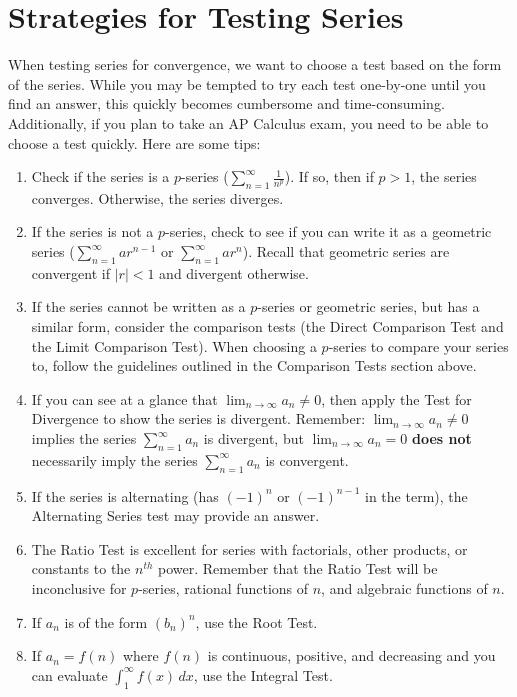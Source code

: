 \section{Strategies for Testing Series}
When testing series for convergence, we want to choose a test based on the 
form of the series. While you may be tempted to try each test one-by-one until 
you find an answer, this quickly becomes cumbersome and time-consuming. 
Additionally, if you plan to take an AP Calculus exam, you need to be able to 
choose a test quickly. Here are some tips:
\begin{enumerate}
\item Check if the series is a $p$-series ($\sum_{n=1}^\infty \frac{1}{n^p}$). 
If so, then if $p > 1$, the series converges. Otherwise, the series diverges.
\item If the series is not a $p$-series, check to see if you can write it as a 
geometric series ($\sum_{n=1}^\infty ar^{n-1}$ or $\sum_{n=1}^\infty ar^n$). 
Recall that geometric series are convergent if $|r| < 1$ and divergent otherwise.
\item If the series cannot be written as a $p$-series or geometric series, but 
has a similar form, consider the comparison tests (the Direct Comparison Test 
and the Limit Comparison Test). When choosing a $p$-series to compare your 
series to, follow the guidelines outlined in the Comparison Tests section 
above. 
\item If you can see at a glance that $\lim_{n \to \infty} a_n \neq 0$, then 
apply the Test for Divergence to show the series is divergent. Remember: $\lim_
{n \to \infty} a_n \neq 0$ implies the series $\sum_{n=1}^\infty a_n$ is 
divergent, but $\lim_{n \to \infty} a_n = 0$ \textbf{does not} necessarily imply the 
series $\sum_{n=1}^\infty a_n$ is convergent. 
\item If the series is alternating (has $(-1)^n$ or $(-1)^{n-1}$ in the term), 
the Alternating Series test may provide an answer. 
\item The Ratio Test is excellent for series with factorials, other products, 
or constants to the $n^{th}$ power. Remember that the Ratio Test will be 
inconclusive for $p$-series, rational functions of $n$, and algebraic functions 
of $n$. 
\item If $a_n$ is of the form $(b_n)^n$, use the Root Test. 
\item If $a_n = f(n)$ where $f(n)$ is continuous, positive, and decreasing and 
you can evaluate $\int_1^\infty f(x)\,dx$, use the Integral Test. 
\end{enumerate}

